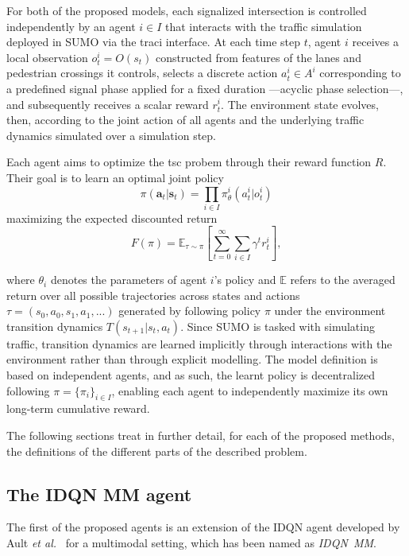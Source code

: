For both of the proposed models, each signalized intersection is controlled independently by an agent $i \in I$ that interacts with the traffic simulation deployed in SUMO via the \gls{traci} interface. At each time step $t$, agent $i$ receives a local observation $o_t^i=O(s_t)$ constructed from features of the lanes and pedestrian crossings it controls, selects a discrete action $a_t^i \in A^i$ corresponding to a predefined signal phase applied for a fixed duration —acyclic phase selection—, and subsequently receives a scalar reward $r_t^i$. The environment state evolves, then, according to the joint action of all agents and the underlying traffic dynamics simulated over a simulation step.

Each agent aims to optimize the \gls{tsc} probem through their reward function $R$. Their goal is to learn an optimal joint policy
\begin{equation} \label{eq:joint_policy}
    \pi( \bm{a}_t|\bm{s}_t)=\prod_{i \in I}\pi^i_\theta(a^i_t|o^i_t)
\end{equation}
maximizing the expected discounted return
\begin{equation} \label{eq:discount_return}
F(\pi)=\mathbb{E}_{\tau\sim\pi}\left[\sum_{t=0}^{\infty}\sum_{i\in I}\gamma^{t}r_{t}^{i}\right],
\end{equation}

\noindent where $\theta_i$ denotes the parameters of agent $i$'s policy and $\mathbb{E}$ refers to the averaged return over all possible trajectories across states and actions $\tau=(s_0, a_0, s_1, a_1,...)$ generated by following policy $\pi$ under the environment transition dynamics $T(s_{t+1}|s_t,a_t)$. Since SUMO is tasked with simulating traffic, transition dynamics are learned implicitly through interactions with the environment rather than through explicit modelling. The model definition is based on independent agents, and as such, the learnt policy is decentralized following $\pi=\{\pi_i \}_{i \in I}$, enabling each agent to independently maximize its own long-term cumulative reward.

The following sections treat in further detail, for each of the proposed methods, the definitions of the different parts of the described problem.

\subsection{The IDQN MM agent} \label{subsec:idqn_mm}

The first of the proposed agents is an extension of the IDQN agent developed by Ault \textit{et al.}~\cite{Ault2019} for a multimodal setting, which has been named as \textit{IDQN~MM}.

